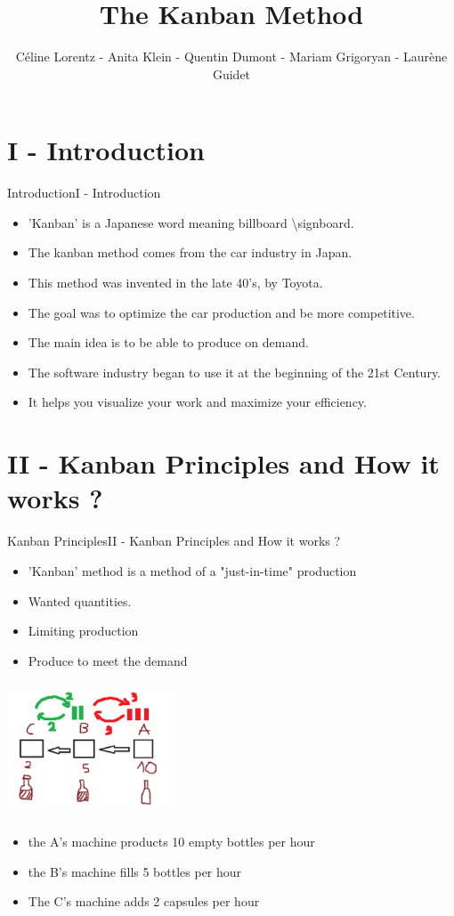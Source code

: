 \documentclass[10pt]{beamer}
\author{Céline Lorentz - Anita Klein - Quentin Dumont - Mariam Grigoryan - Laurène Guidet}
\title{The Kanban Method}
\newcommand{\PI}{I - Introduction}
\newcommand{\PII}{II - Kanban Principles and How it works ?}
\begin{document}
    
\begin{frame}

    \maketitle

\end{frame}
\section{\PI} 
\begin{frame}{Introduction}{\PI} 
    \begin{itemize}
        \item 'Kanban' is a Japanese word meaning billboard \textbackslash signboard. 
        \item The kanban method comes from the car industry in Japan.
        \item This method was invented in the late 40's, by Toyota.
        \item The goal was to optimize the car production and be more competitive.
        \item The main idea is to be able to produce on demand.
        \item The software industry began to use it at the beginning of the 21st Century.
        \item It helps you visualize your work and maximize your efficiency.
    \end{itemize}  

\end{frame}
\section{\PII} 
\begin{frame}{Kanban Principles}{\PII}
    \begin{itemize}
        \item 'Kanban' method is a method of a "just-in-time" production 
        \item Wanted quantities.
        \item Limiting production 
        \item Produce to meet the demand
    \end{itemize}  
\quad \quad  \quad \quad \quad \quad 
\includegraphics[width=5cm, height=4cm]{kanban.PNG}
    \begin{itemize}
        \item the A's machine products 10 empty bottles per hour
        \item the B's machine fills 5 bottles per hour
        \item The C's machine adds 2 capsules per hour
    \end{itemize}  
\end{frame}
\end{document}
